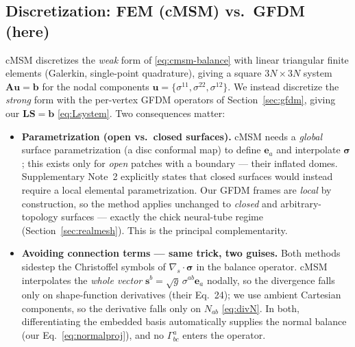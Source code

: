 \documentclass[11pt]{article}
\newcommand{\vv}[1]{\bm{#1}}
\newcommand{\divs}{\nabla_{\!s}\!\cdot}
\begin{document}
\subsection{Discretization: FEM (cMSM) vs.\ GFDM (here)}
cMSM discretizes the \emph{weak} form of \eqref{eq:cmsm-balance} with linear triangular
finite elements (Galerkin, single-point quadrature), giving a square $3N\times3N$ system
$\mathbf A\vv u=\vv b$ for the nodal components $\vv u=\{\sigma^{11},\sigma^{22},\sigma^{12}\}$.
We instead discretize the \emph{strong} form with the per-vertex GFDM operators of
Section~\ref{sec:gfdm}, giving our $\mathbf L\vv S=\vv b$ \eqref{eq:Lsystem}. Two consequences
matter:
\begin{itemize}[noitemsep]
  \item \textbf{Parametrization (open vs.\ closed surfaces).} cMSM needs a \emph{global}
        surface parametrization (a disc conformal map) to define $\vv e_a$ and interpolate
        $\bm\sigma$; this exists only for \emph{open} patches with a boundary --- their
        inflated domes. Supplementary Note~2 explicitly states that closed surfaces would
        instead require a local elemental parametrization. Our GFDM frames are \emph{local}
        by construction, so the method applies unchanged to \emph{closed} and
        arbitrary-topology surfaces --- exactly the chick neural-tube regime
        (Section~\ref{sec:realmesh}). This is the principal complementarity.
  \item \textbf{Avoiding connection terms --- same trick, two guises.} Both methods sidestep
        the Christoffel symbols of $\divs\bm\sigma$ in the balance operator. cMSM interpolates
        the \emph{whole vector} $\vv s^{b}=\sqrt g\,\sigma^{ab}\vv e_a$ nodally, so the
        divergence falls only on shape-function derivatives (their Eq.~24); we use ambient
        Cartesian components, so the derivative falls only on $N_{ab}$ \eqref{eq:divN}. In
        both, differentiating the embedded basis automatically supplies the normal balance
        (our Eq.~\eqref{eq:normalproj}), and no $\Gamma^a_{bc}$ enters the operator.
\end{itemize}
\end{document}
